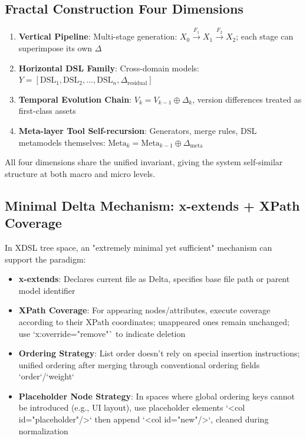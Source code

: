 \documentclass[11pt]{article}
\begin{document}
\subsection{Fractal Construction Four Dimensions}

\begin{enumerate}
\item \textbf{Vertical Pipeline}: Multi-stage generation: $X_0 \xrightarrow{F_1} X_1 \xrightarrow{F_2} X_2$; each stage can superimpose its own $\Delta$

\item \textbf{Horizontal DSL Family}: Cross-domain models: $Y = [\mathrm{DSL}_1, \mathrm{DSL}_2, \ldots, \mathrm{DSL}_n, \Delta_{\mathrm{residual}}]$

\item \textbf{Temporal Evolution Chain}: $V_k = V_{k-1} \oplus \Delta_k$, version differences treated as first-class assets

\item \textbf{Meta-layer Tool Self-recursion}: Generators, merge rules, DSL metamodels themselves: $\mathrm{Meta}_k = \mathrm{Meta}_{k-1} \oplus \Delta_{\mathrm{meta}}$
\end{enumerate}

All four dimensions share the unified invariant, giving the system self-similar structure at both macro and micro levels.

\subsection{Minimal Delta Mechanism: x-extends + XPath Coverage}

In XDSL tree space, an "extremely minimal yet sufficient" mechanism can support the paradigm:

\begin{itemize}
\item \textbf{x-extends}: Declares current file as Delta, specifies base file path or parent model identifier
\item \textbf{XPath Coverage}: For appearing nodes/attributes, execute coverage according to their XPath coordinates; unappeared ones remain unchanged; use `x:override="remove"` to indicate deletion
\item \textbf{Ordering Strategy}: List order doesn't rely on special insertion instructions; unified ordering after merging through conventional ordering fields `order`/`weight`
\item \textbf{Placeholder Node Strategy}: In spaces where global ordering keys cannot be introduced (e.g., UI layout), use placeholder elements `<col id="placeholder"/>` then append `<col id="new"/>`, cleaned during normalization
\end{itemize}
\end{document}
